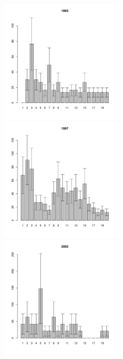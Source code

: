 \begin{figure}[h]
\begin{multicols}{3}
\hfill
\includegraphics[width=60mm]{../White_Sea/Luvenga_II_razrez/low_beatch_1993_.pdf}
\hfill
\includegraphics[width=60mm]{../White_Sea/Luvenga_II_razrez/low_beatch_1997_.pdf}
\hfill
\includegraphics[width=60mm]{../White_Sea/Luvenga_II_razrez/low_beatch_2002_.pdf}
\end{multicols}



\end{figure}
